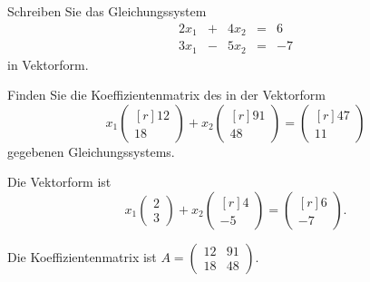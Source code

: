 \begin{teilaufgaben}
\item
Schreiben Sie das Gleichungssystem
\[
\renewcommand{\arraycolsep}{2pt}
\begin{array}{rcrcr}
2x_1 &+& 4x_2 &=&  6 \\
3x_1 &-& 5x_2 &=& -7 
\end{array}
\]
in Vektorform.
\item
Finden Sie die Koeffizientenmatrix des in der Vektorform 
\[
x_1
\begin{pmatrix*}[r]12\\18\end{pmatrix*}
+
x_2
\begin{pmatrix*}[r]91\\48\end{pmatrix*}
=
\begin{pmatrix*}[r]47\\11\end{pmatrix*}
\]
gegebenen Gleichungssystems.
\end{teilaufgaben}

\begin{loesung}
\begin{teilaufgaben}
\item
Die Vektorform ist
\[
x_1
\begin{pmatrix}2\\3\end{pmatrix}
+
x_2
\begin{pmatrix*}[r]4\\-5\end{pmatrix*}
=
\begin{pmatrix*}[r] 6\\-7\end{pmatrix*}.
\]
\item
Die Koeffizientenmatrix ist $A=\begin{pmatrix}12&91\\18&48\end{pmatrix}$.
\qedhere
\end{teilaufgaben}
\end{loesung}
